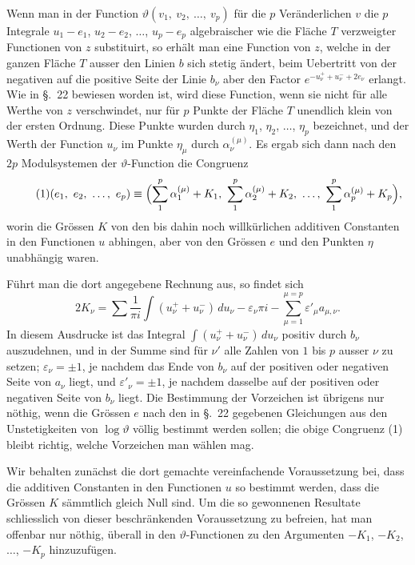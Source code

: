 \documentclass[12pt,a4paper]{book}
\theoremstyle{definition}
\theoremstyle{remark}
\begin{document}
Wenn man in der Function $\vartheta(v_1,\ v_2,\ \ldots,\ v_p)$ für die $p$ Veränderlichen $v$ die $p$ Integrale $u_1 - e_1$, $u_2 - e_2$, $\ldots$, $u_p - e_p$ algebraischer wie die Fläche $T$ verzweigter Functionen von $z$ substituirt, so erhält man eine Function von $z$, welche in der ganzen Fläche $T$ ausser den Linien $b$ sich stetig ändert, beim Uebertritt von der negativen auf die positive Seite der Linie $b_\nu$ aber den Factor $e^{-u_\nu^+ + u_\nu^- + 2e_\nu}$ erlangt. Wie in \S.~22 bewiesen worden ist, wird diese Function, wenn sie nicht für alle Werthe von $z$ verschwindet, nur für $p$ Punkte der Fläche $T$ unendlich klein von der ersten Ordnung. Diese Punkte wurden durch $\eta_1$, $\eta_2$, $\ldots$, $\eta_p$ bezeichnet, und der Werth der Function $u_\nu$ im Punkte $\eta_\mu$ durch $\alpha_\nu^{(\mu)}$. Es ergab sich dann nach den $2p$ Modulsystemen der $\vartheta$-Function die Congruenz
\begin{equation}
\tag{1} (e_1,\ e_2,\ \ldots,\ e_p) \equiv \Bigl(\sum_1^p \alpha_1^{(\mu)} + K_1,\ \sum_1^p \alpha_2^{(\mu)} + K_2,\ \ldots,\ \sum_1^p \alpha_p^{(\mu)} + K_p\Bigr), \end{equation}
worin die Grössen $K$ von den bis dahin noch willkürlichen additiven Constanten in den Functionen $u$ abhingen, aber von den Grössen $e$ und den Punkten $\eta$ unabhängig waren.

Führt man die dort angegebene Rechnung aus, so findet sich
\begin{equation}
\tag{2} 2K_\nu = \sum \frac{1}{\pi i}\int (u_\nu^+ + u_\nu^-)\,du_\nu - \varepsilon_\nu\pi i - \sum_{\mu=1}^{\mu=p} \varepsilon'_\mu a_{\mu,\nu}. \end{equation}
In diesem Ausdrucke ist das Integral $\int(u_\nu^+ + u_\nu^-)\,du_\nu$ positiv durch $b_\nu$ auszudehnen, und in der Summe sind für $\nu'$ alle Zahlen von $1$ bis $p$ ausser $\nu$ zu setzen; $\varepsilon_\nu = \pm 1$, je nachdem das Ende von $b_\nu$ auf der positiven oder negativen Seite von $a_\nu$ liegt, und $\varepsilon'_\nu = \pm 1$, je nachdem dasselbe auf der positiven oder negativen Seite von $b_\nu$ liegt. Die Bestimmung der Vorzeichen ist übrigens nur nöthig, wenn die Grössen $e$ nach den in \S.~22 gegebenen Gleichungen aus den Unstetigkeiten von $\log\vartheta$ völlig bestimmt werden sollen; die obige Congruenz (1) bleibt richtig, welche Vorzeichen man wählen mag.

Wir behalten zunächst die dort gemachte vereinfachende Voraussetzung bei, dass die additiven Constanten in den Functionen $u$ so bestimmt werden, dass die Grössen $K$ sämmtlich gleich Null sind. Um die so gewonnenen Resultate schliesslich von dieser beschränkenden Voraussetzung zu befreien, hat man offenbar nur nöthig, überall in den $\vartheta$-Functionen zu den Argumenten $-K_1$, $-K_2$, $\ldots$, $-K_p$ hinzuzufügen.
\end{document}
